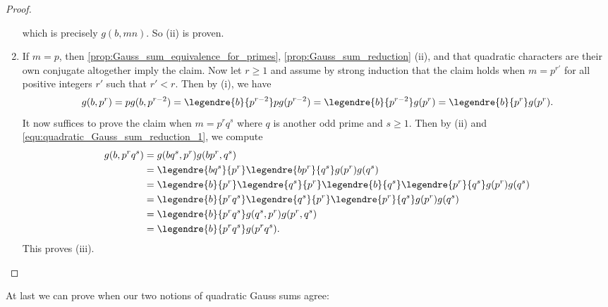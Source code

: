 \begin{proof}
\begin{enumerate}[label=(\roman*)]
              which is precisely $g(b,mn)$. So (ii) is proven.
            \item If $m = p$, then \cref{prop:Gauss_sum_equivalence_for_primes}, \cref{prop:Gauss_sum_reduction} (ii), and that quadratic characters are their own conjugate altogether imply the claim. Now let $r \ge 1$ and assume by strong induction that the claim holds when $m = p^{r'}$ for all positive integers $r'$ such that $r' < r$. Then by (i), we have
            \begin{equation}\label{equ:quadratic_Gauss_sum_reduction_1}
              g(b,p^{r}) = pg(b,p^{r-2}) = \legendre{b}{p^{r-2}}pg(p^{r-2}) = \legendre{b}{p^{r-2}}g(p^{r}) = \legendre{b}{p^{r}}g(p^{r}).
            \end{equation}
            It now suffices to prove the claim when $m = p^{r}q^{s}$ where $q$ is another odd prime and $s \ge 1$. Then by (ii) and \cref{equ:quadratic_Gauss_sum_reduction_1}, we compute
            \begin{align*}
              g(b,p^{r}q^{s}) &= g(bq^{s},p^{r})g(bp^{r},q^{s}) \\
              &= \legendre{bq^{s}}{p^{r}}\legendre{bp^{r}}{q^{s}}g(p^{r})g(q^{s}) \\
              &= \legendre{b}{p^{r}}\legendre{q^{s}}{p^{r}}\legendre{b}{q^{s}}\legendre{p^{r}}{q^{s}}g(p^{r})g(q^{s}) \\
              &= \legendre{b}{p^{r}q^{s}}\legendre{q^{s}}{p^{r}}\legendre{p^{r}}{q^{s}}g(p^{r})g(q^{s}) \\
              &= \legendre{b}{p^{r}q^{s}}g(q^{s},p^{r})g(p^{r},q^{s}) \\
              &= \legendre{b}{p^{r}q^{s}}g(p^{r}q^{s}).
            \end{align*}
            This proves (iii).
          \end{enumerate}
        \end{proof}

        At last we can prove when our two notions of quadratic Gauss sums agree:

